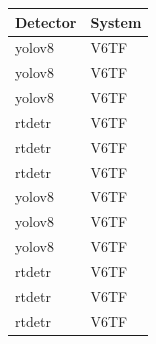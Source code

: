 \begin{tabular}{ll}
\toprule
Detector & System &  \\
\midrule
yolov8 & V6TF &  \\
yolov8 & V6TF &  \\
yolov8 & V6TF &  \\
rtdetr & V6TF &  \\
rtdetr & V6TF &  \\
rtdetr & V6TF &  \\
yolov8 & V6TF &  \\
yolov8 & V6TF &  \\
yolov8 & V6TF &  \\
rtdetr & V6TF &  \\
rtdetr & V6TF &  \\
rtdetr & V6TF &  \\
\bottomrule
\end{tabular}

